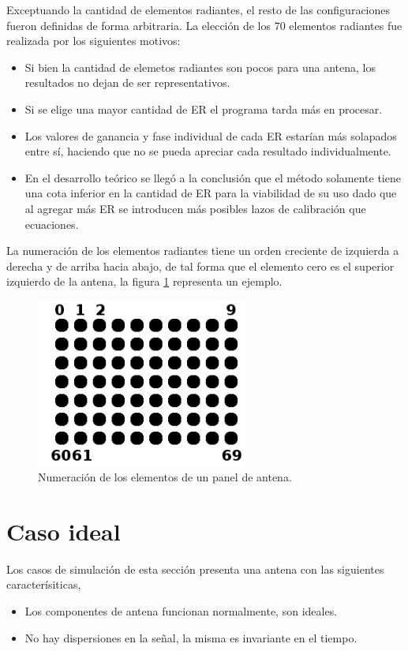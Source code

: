Exceptuando la cantidad de elementos radiantes, el resto de las configuraciones fueron definidas de forma arbitraria. La
elección de los 70 elementos radiantes fue realizada por los siguientes motivos:
\begin{itemize}
	\item Si bien la cantidad de elemetos radiantes son pocos para una antena, los resultados no dejan de ser representativos.
	\item Si se elige una mayor cantidad de ER el programa tarda más en procesar. 
	\item Los valores de ganancia y fase individual de cada ER estarían más solapados entre sí, haciendo que no se pueda apreciar
		cada resultado individualmente. 
	\item En el desarrollo teórico se llegó a la conclusión que el método solamente tiene una cota inferior en la cantidad de ER
		para la viabilidad de su uso dado que al agregar más ER se introducen más posibles lazos de calibración que ecuaciones.
\end{itemize}

La numeración de los elementos radiantes tiene un orden creciente de izquierda a derecha y de arriba hacia abajo, de tal forma
que el elemento cero es el superior izquierdo de la antena, la figura \ref{fig:arrayNumeration} representa un ejemplo.

\begin{figure}[H]
 \centering
 \includegraphics[width=7cm]{gfx/arrayNumeration.png}
 \caption{Numeración de los elementos de un panel de antena.}
 \label{fig:arrayNumeration}
\end{figure}


\section{Caso ideal}
\label{sc:withoutDispersion} 


Los casos de simulación de esta sección presenta una antena con las siguientes caracterísiticas,
\begin{itemize}
	\item Los componentes de antena funcionan normalmente, son ideales.
	\item No hay dispersiones en la señal, la misma es invariante en el tiempo.
\end{itemize}


